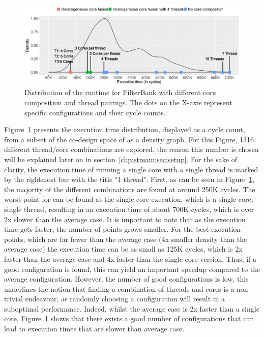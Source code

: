 \begin{figure}[t]
    \centering
    \includegraphics[width=1\textwidth]{streamit-paper/graphics/filterbank_motivation_3.pdf}
    \caption{Distribution of the runtime for FilterBank with different core composition and thread pairings. The dots on the X-axis represent specific configurations and their cycle counts.}
     \label{fig:threadcoremotiv}
\end{figure}

Figure~\ref{fig:threadcoremotiv} presents the execution time distribution, displayed as a cycle count, from a subset of the co-design space of  as a density graph.
For this Figure, 1316 different thread/core combinations are explored, the reason this number is chosen will be explained later on in section~\ref{chp:stream:sec:setup}.
For the sake of clarity, the execution time of running a single core with a single thread is marked by the rightmost bar with the title "1 thread".
First, as can be seen in Figure~\ref{fig:threadcoremotiv}, the majority of the different combinations are found at around 250K cycles.
The worst point for  can be found at the single core execution, which is a single core, single thread, resulting in an execution time of about 700K cycles, which is over 2x slower than the average case.
It is important to note that as the execution time gets faster, the number of points grows smaller.
For the best execution points, which are far fewer than the average case (4x smaller density than the average case) the execution time can be as small as 125K cycles, which is 2x faster than the average case and 4x faster than the single core version.
Thus, if a good configuration is found, this can yield an important speedup compared to the average configuration.
However, the number of good configurations is low, this underlines the notion that finding a combination of threads and cores is a non-trivial endeavour, as randomly choosing a configuration will result in a suboptimal performance.
Indeed, whilst the average case is 2x faster than a single core, Figure~\ref{fig:threadcoremotiv} shows that there exists a good number of configurations that can lead to execution times that are slower than average case.



